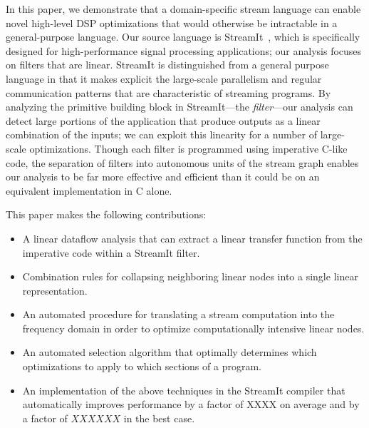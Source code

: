 In this paper, we demonstrate that a domain-specific stream language
can enable novel high-level DSP optimizations that would otherwise be
intractable in a general-purpose language.  Our source language is
StreamIt~\cite{streamit-asplos,gordon-thesis,streamitcc}, which is 
specifically designed for high-performance signal processing applications; 
our analysis focuses on filters that are linear.  StreamIt is
distinguished from a general purpose language in that it makes
explicit the large-scale parallelism and regular communication
patterns that are characteristic of streaming programs.  By analyzing
the primitive building block in StreamIt---the {\it filter}---our analysis
can detect large portions of the application that produce outputs as a
linear combination of the inputs; we can exploit this linearity for a
number of large-scale optimizations.  Though each filter is programmed
using imperative C-like code, the separation of filters into
autonomous units of the stream graph enables our analysis to be far
more effective and efficient than it could be on an equivalent
implementation in C alone.

This paper makes the following contributions:
\begin{itemize}

\item A linear dataflow analysis that can extract a linear transfer
function from the imperative code within a StreamIt filter.
\vspace{-6pt}

\item Combination rules for collapsing neighboring linear nodes into a
single linear representation.
\vspace{-6pt}

\item An automated procedure for translating a stream computation into
the frequency domain in order to optimize computationally intensive
linear nodes.
\vspace{-6pt}

\item An automated selection algorithm that optimally determines 
which optimizations to apply to which sections of a program.
\vspace{-6pt}

\item An implementation of the above techniques in the StreamIt
compiler that automatically improves performance by a factor of
XXXX  on average and by a factor of $XXXXXX$ in the best case.

\end{itemize}

